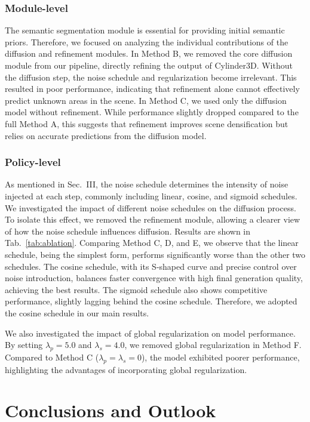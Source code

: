 \documentclass[conference]{IEEEtran}
\begin{document}
\subsubsection{Module-level}

The semantic segmentation module is essential for providing initial semantic priors.
Therefore, we focused on analyzing the individual contributions of the diffusion and refinement modules.
In Method B, we removed the core diffusion module from our pipeline, directly refining the output of Cylinder3D.
Without the diffusion step, the noise schedule and regularization become irrelevant.
This resulted in poor performance, indicating that refinement alone cannot effectively predict unknown areas in the scene.
In Method C, we used only the diffusion model without refinement.
While performance slightly dropped compared to the full Method A, this suggests that refinement improves scene densification but relies on accurate predictions from the diffusion model.

\subsubsection{Policy-level}

As mentioned in Sec.~III, the noise schedule determines the intensity of noise injected at each step, commonly including linear, cosine, and sigmoid schedules.
We investigated the impact of different noise schedules on the diffusion process.
To isolate this effect, we removed the refinement module, allowing a clearer view of how the noise schedule influences diffusion.
Results are shown in Tab.~\ref{tab:ablation}.
Comparing Method C, D, and E, we observe that the linear schedule, being the simplest form, performs significantly worse than the other two schedules.
The cosine schedule, with its S-shaped curve and precise control over noise introduction, balances faster convergence with high final generation quality, achieving the best results.
The sigmoid schedule also shows competitive performance, slightly lagging behind the cosine schedule.
Therefore, we adopted the cosine schedule in our main results.

We also investigated the impact of global regularization on model performance.
By setting $\lambda_p = 5.0$ and $\lambda_s = 4.0$, we removed global regularization in Method F.
Compared to Method C ($\lambda_p = \lambda_s = 0$), the model exhibited poorer performance, highlighting the advantages of incorporating global regularization.

\section{Conclusions and Outlook}
\end{document}
